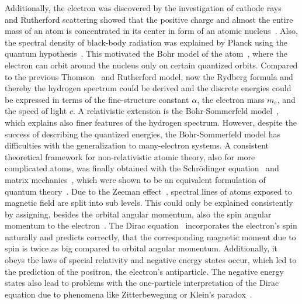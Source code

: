 Additionally, the electron was discovered by the investigation of cathode rays~\cite{thomson1897,rechenberg1997} and Rutherford scattering showed that the positive charge and almost the entire mass of an atom is concentrated in its center in form of an atomic nucleus~\cite{rutherford1911}. Also, the spectral density of black-body radiation was explained by Planck using the quantum hypothesis~\cite{planck1978}. This motivated the Bohr model of the atom~\cite{bohr1913}, where the electron can orbit around the nucleus only on certain quantized orbits. Compared to the previous Thomson~\cite{thomson1904} and Rutherford model, now the Rydberg formula and thereby the hydrogen spectrum could be derived and the discrete energies could be expressed in terms of the fine-structure constant $\alpha$, the electron mass $m_e$, and the speed of light $c$. A relativistic extension is the Bohr-Sommerfeld model~\cite{sommerfeld1916}, which explains also finer features of the hydrogen spectrum.
However, despite the success of describing the quantized energies, the Bohr-Sommerfeld model has difficulties with the generalization to many-electron systems. A consistent theoretical framework for non-relativistic atomic theory, also for more complicated atoms, was finally obtained with the Schrödinger equation~\cite{schrodinger1926_1,schrodinger1926_2,schrodinger1926_3,schrodinger1926_4} and matrix mechanics~\cite{heisenberg1925,born1925,born1926}, which were shown to be an equivalent formulation of quantum theory~\cite{schrodinger1926_5}.
Due to the Zeeman effect~\cite{zeeman1896}, spectral lines of atoms exposed to magnetic field are split into sub levels. This could only be explained consistently by assigning, besides the orbital angular momentum, also the spin angular momentum to the electron~\cite{uhlenbeck1925}. The Dirac equation~\cite{dirac1928} incorporates the electron's spin naturally and predicts correctly, that the corresponding magnetic moment due to spin is twice as big compared to orbital angular momentum. Additionally, it obeys the laws of special relativity and negative energy states occur, which led to the prediction of the positron, the electron's antiparticle. The negative energy states also lead to problems with the one-particle interpretation of the Dirac equation due to phenomena like Zitterbewegung or Klein's paradox~\cite{the_dirac_eq}.


